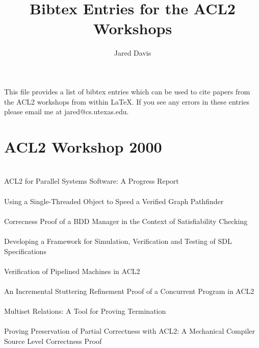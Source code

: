 \documentclass{article}
\title{Bibtex Entries for the ACL2 Workshops}
\author{Jared Davis}
\begin{document}
\maketitle

This file provides a list of bibtex entries which can be used to cite papers
from the ACL2 workshops from within \LaTeX{}.  If you see any errors in these 
entries please email me at {\sf jared@cs.utexas.edu}.

\section{ACL2 Workshop 2000}

\cite{00-lusk-parallel} \\
ACL2 for Parallel Systems Software: A Progress Report \\

\cite{00-wilding-stobj} \\
Using a Single-Threaded Object to Speed a Verified Graph Pathfinder \\

\cite{00-sumners-bdds} \\
Correcness Proof of a BDD Manager in the Context of Satisfiability Checking \\

\cite{00-shumsky-sdl} \\
Developing a Framework for Simulation, Verification and Testing of SDL Specifications \\

\cite{00-manolios-pipeline} \\
Verification of Pipelined Machines in ACL2 \\

\cite{00-sumners-stuttering} \\
An Incremental Stuttering Refinement Proof of a Concurrent Program in ACL2 \\

\cite{00-reina-multiset} \\
Multiset Relations: A Tool for Proving Termination \\

\cite{00-goerigk} \\
Proving Preservation of Partial Correctness with ACL2: A Mechanical Compiler Source Level Correctness Proof \\
\end{document}
